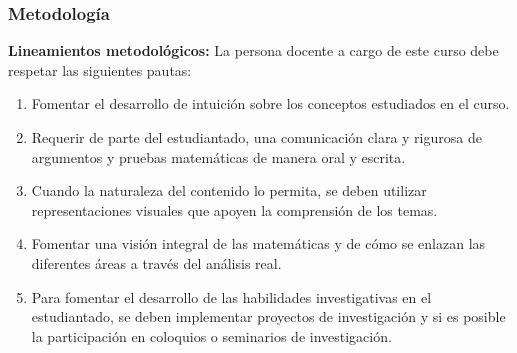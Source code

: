 \begin{refsection}
\begin{enumerate}
\end{enumerate}

\subsubsection*{Metodología}

\noindent \textbf{Lineamientos metodológicos:} La persona docente a cargo de este curso debe respetar las siguientes pautas:
\begin{enumerate}
    \item Fomentar el desarrollo de intuición sobre los conceptos estudiados en el curso. 
    \item Requerir de parte del estudiantado, una comunicación clara y rigurosa de argumentos y pruebas matemáticas de manera oral y escrita.
    \item Cuando la naturaleza del contenido lo permita, se deben utilizar representaciones visuales que apoyen la comprensión de los temas.
    \item Fomentar una visión integral de las matemáticas y de cómo se enlazan las diferentes áreas a través del análisis real.
    \item Para fomentar el desarrollo de las habilidades investigativas en el estudiantado, se deben implementar proyectos de investigación y si es posible la participación en coloquios o seminarios de investigación.
\end{enumerate}


\end{refsection}
